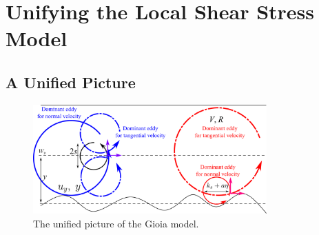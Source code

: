 \documentclass[10pt]{article}
\begin{document}
\section{Unifying the Local Shear Stress Model}

\subsection{A Unified Picture}

\begin{figure}[htpb]
    \centering
    \includegraphics[width=0.8\textwidth]{./figures/unify-gioia-model.pdf}
    \caption{The unified picture of the Gioia model.}
    \label{fig:-figures-unify-gioia-model-pdf}
\end{figure}
\end{document}
